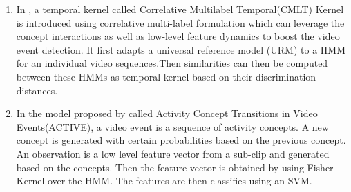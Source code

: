 \begin{enumerate}
\item In \citet{CMLT}, a temporal kernel called Correlative Multilabel Temporal(CMLT) Kernel is introduced using correlative multi-label formulation which can leverage the concept interactions as well as low-level feature dynamics to boost the video event detection. It first adapts a universal reference model (URM) to a HMM for an individual video sequences.Then similarities can then be computed between these HMMs as temporal kernel based on their discrimination distances.


 
\item In the model proposed by \citet{Active} called Activity Concept Transitions in Video Events(ACTIVE), a video event is a sequence of activity concepts. A new concept is generated with certain probabilities based on the previous concept. An observation is a low level feature vector from a sub-clip and generated based on the concepts. Then the feature vector is obtained by using Fisher Kernel over the HMM. The features are then classifies using an SVM.

\end{enumerate}

